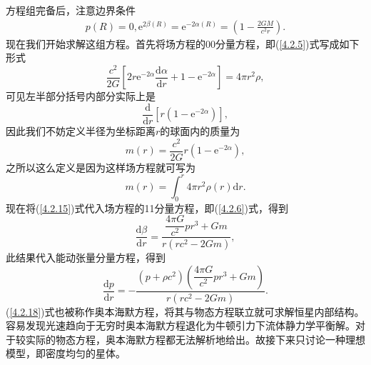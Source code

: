 \documentclass[11pt, a4paper, oneside, onecolumn]{ctexart}
\numberwithin{equation}{subsection}
\begin{document}
方程组完备后，注意边界条件
\begin{align}
p\left(R\right)=0,\mathrm{e}^{2\beta\left(R\right)}=\mathrm{e}^{-2\alpha\left(R\right)}=\left(1-\frac{2GM}{c^{2}r}\right).
\end{align}
现在我们开始求解这组方程。首先将场方程的00分量方程，即(\ref{4.2.5})式写成如下形式
\begin{equation}
\frac{c^{2}}{2G}\left[2r\mathrm{e}^{-2\alpha}\frac{\mathrm{d}\alpha}{\mathrm{d}r}+1-\mathrm{e}^{-2\alpha}\right]=4\pi r^{2}\rho,
\end{equation}
可见左半部分括号内部分实际上是
\begin{equation}
\frac{\mathrm{d}}{\mathrm{d}r}\left[r\left(1-\mathrm{e}^{-2\alpha}\right)\right],
\end{equation}
因此我们不妨定义半径为坐标距离$r$的球面内的质量为
\begin{equation}
m\left(r\right)=\frac{c^{2}}{2G}r\left(1-\mathrm{e}^{-2\alpha}\right),\label{4.2.15}
\end{equation}
之所以这么定义是因为这样场方程就可写为
\begin{equation}
m\left(r\right)=\int_{0}^{r}4\pi r^{2}\rho\left(r\right)\mathrm{d}r.
\end{equation}
现在将(\ref{4.2.15})式代入场方程的11分量方程，即(\ref{4.2.6})式，得到
\begin{equation}
\frac{\mathrm{d}\beta}{\mathrm{d}r}=\frac{\dfrac{4\pi G}{c^{2}}pr^{3}+Gm}{r\left(rc^{2}-2Gm\right)},\label{4.2.17}
\end{equation}
此结果代入能动张量分量方程，得到
\begin{equation}
\frac{\mathrm{d}p}{\mathrm{d}r}=-\frac{\left(p+\rho c^{2}\right)\left(\dfrac{4\pi G}{c^{2}}pr^{3}+Gm\right)}{r\left(rc^{2}-2Gm\right)}.\label{4.2.18}
\end{equation}
(\ref{4.2.18})式也被称作奥本海默方程，将其与物态方程联立就可求解恒星内部结构。容易发现光速趋向于无穷时奥本海默方程退化为牛顿引力下流体静力学平衡解。对于较实际的物态方程，奥本海默方程都无法解析地给出。故接下来只讨论一种理想模型，即密度均匀的星体。
\end{document}
